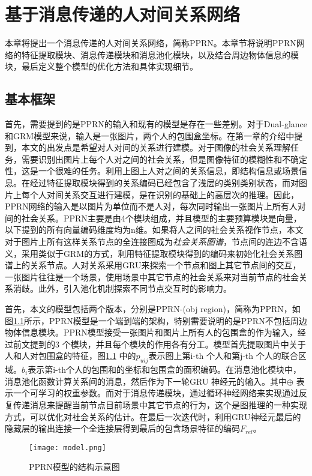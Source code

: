 
\chapter{基于消息传递的人对间关系网络}
\label{ch:model}

本章将提出一个消息传递的人对间关系网络，简称PPRN。本章节将说明PPRN网络的特征提取模块、消息传递模块和消息池化模块，以及结合周边物体信息的模块，最后定义整个模型的优化方法和具体实现细节。


\section{基本框架}
首先，需要提到的是PPRN的输入和现有的模型是存在一些差别。对于Dual-glance和GRM模型来说，输入是一张图片，两个人的包围盒坐标。在第一章的介绍中提到，本文的出发点是希望对人对间的关系进行建模。对于图像的社会关系理解任务，需要识别出图片上每个人对之间的社会关系，但是图像特征的模糊性和不确定性，这是一个很难的任务。利用上图上人对之间的关系信息，即结构信息或场景信息。在经过特征提取模块得到的关系编码已经包含了浅层的类别类别状态，而对图片上每个人对间关系交互进行建模，是在识别的基础上的高层次的推理。因此，PPRN网络的输入是以图片为单位而不是人对，每次同时输出一张图片上所有人对间的社会关系。PPRN主要是由4个模块组成，并且模型的主要预算模块是向量，以下提到的所有向量编码维度均为n维。如果将人之间的社会关系视作节点，本文对于图片上所有这样关系节点的全连接图成为{\it 社会关系图谱}，节点间的连边不含语义，采用类似于GRM的方式，利用特征提取模块得到的编码来初始化社会关系图谱上的关系节点。人对关系采用GRU来探索一个节点和图上其它节点间的交互，一张图片往往是一个场景，使用场景中其它节点的社会关系来对当前节点的社会关系消歧。此外，引入池化机制探索不同节点交互时的影响力。

首先，本文的模型包括两个版本，分别是PPRN-(obj region)，简称为PPRN，如图\ref{fig:model-pprn}所示，PPRN模型是一个端到端的架构，特别需要说明的是PPRN不包括周边物体信息模块。PPRN模型接受一张图片和图片上所有人的包围盒的作为输入，经过前文提到的3 个模块，并且每个模块的作用各有分工。模型首先提取图片中关于人和人对包围盒的特征，图\ref{fig:model-pprn} 中的$p_{uij}$表示图上第i-th 个人和第j-th 个人的联合区域。$b_{i}$表示第i-th个人的包围和的坐标和包围盒的面积编码。在消息池化模块中，消息池化函数计算关系间的消息，然后作为下一轮GRU 神经元的输入。其中$\oplus$ 表示一个可学习的权重参数。而对于消息传递模块，通过循环神经网络来实现通过反复传递消息来提醒当前节点目前场景中其它节点的行为，这个是图推理的一种实现方式，可以优化对社会关系的估计。在最后一次迭代时，利用GRU神经元最后的隐藏层的输出连接一个全连接层得到最后的包含场景特征的编码$F_{rel}$。
\begin{figure}[htpb]
	\centering
	\texttt{[image: model.png]}
    \caption{PPRN模型的结构示意图}
	\vspace*{-3.5mm}
	\label{fig:model-pprn}
\end{figure}


